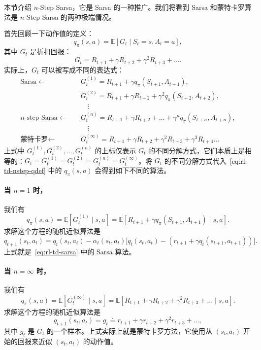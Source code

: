 本节介绍 $n$-Step Sarsa，它是 Sarsa 的一种推广。我们将看到 Sarsa 和蒙特卡罗算法是 $n$-Step Sarsa 的两种极端情况。

首先回顾一下动作值的定义：
\begin{equation}
  q_{\pi}(s, a) = \mathbb{E}[G_t \mid S_t = s, A_t = a],
  \label{eq:rl-td-nstep-qdef}
\end{equation}
其中 $G_t$ 是折扣回报：
\[
  G_t = R_{t+1} + \gamma R_{t+2} + \gamma^2 R_{t+3} + \dots .
\]
实际上，$G_t$ 可以被写成不同的表达式：
\begin{align*}
  \mathrm{Sarsa} \longleftarrow \quad & G_t^{(1)} = R_{t+1} + \gamma q_{\pi}(S_{t+1}, A_{t+1}), \\
  & G_t^{(2)} = R_{t+1} + \gamma R_{t+2} + \gamma^2 q_{\pi}(S_{t+2}, A_{t+2}), \\
  & \quad \vdots \\
  n\text{-step Sarsa} \longleftarrow \quad & G_t^{(n)} = R_{t+1} + \gamma R_{t+2} + \dots + \gamma^n q_{\pi}(S_{t+n}, A_{t+n}), \\
  & \quad \vdots \\
  \text{蒙特卡罗} \longleftarrow \quad & G_t^{(\infty)} = R_{t+1} + \gamma R_{t+2} + \gamma^2 R_{t+3} + \gamma^3 R_{t+4} \dots
\end{align*}
上式中 $G_t^{(1)}, G_t^{(2)}, \ldots, G_t^{(n)}$ 的上标仅表示 $G_t$ 的不同分解方式，它们本质上是相等的：$G_t = G_t^{(1)} = G_t^{(2)} = G_t^{(n)} = G_t^{(\infty)}$。将 $G_t$ 的不同分解方式代入~\eqref{eq:rl-td-nstep-qdef} 中的 $q_{\pi}(s, a)$ 会得到如下不同的算法。

\paragraph{当 $n = 1$ 时，} 我们有
\[
  q_{\pi}(s, a) = \mathbb{E}[G_t^{(1)} \mid s, a] = \mathbb{E}[R_{t+1} + \gamma q_{\pi}(S_{t+1}, A_{t+1}) \mid s, a].
\]
求解这个方程的随机近似算法是
\[
  q_{t+1}(s_t, a_t) = q_t(s_t, a_t) - \alpha_t(s_t, a_t) \Big[ q_t(s_t, a_t) - (r_{t+1} + \gamma q_t(s_{t+1}, a_{t+1})) \Big].
\]
上式就是~\eqref{eq:rl-td-sarsa} 中的 Sarsa 算法。

\paragraph{当 $n = \infty$ 时，} 我们有
\[
  q_{\pi}(s, a) = \mathbb{E}[G_t^{(\infty)} \mid s, a] = \mathbb{E}[R_{t+1} + \gamma R_{t+2} + \gamma^2 R_{t+3} + \dots \mid s, a].
\]
求解这个方程的随机近似算法是
\[
  q_{t+1}(s_t, a_t) = g_t \doteq r_{t+1} + \gamma r_{t+2} + \gamma^2 r_{t+3} + \dots ,
\]
其中 $g_t$ 是 $G_t$ 的一个样本。上式实际上就是蒙特卡罗方法，它使用从 $(s_t, a_t)$ 开始的回报来近似 $(s_t, a_t)$ 的动作值。

